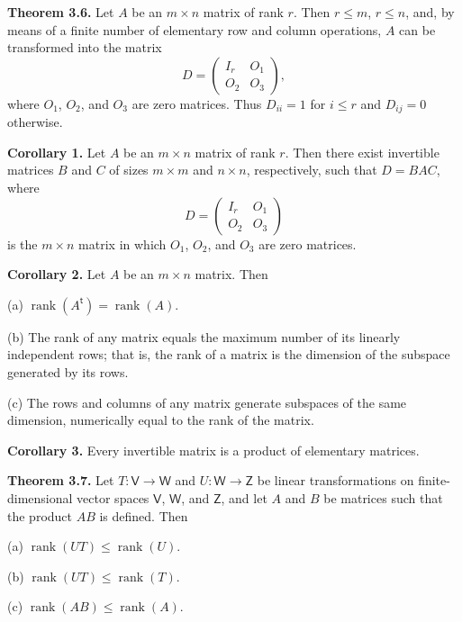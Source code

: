 \documentclass{article}
\newcommand{\0}{\mathit{0}}
\begin{document}
\medskip

\textbf{Theorem 3.6.} Let $A$ be an $m \times n$ matrix of rank $r$. Then $r \leq m$, $r \leq n$, 
and, by means of a finite number of elementary row and column operations, 
$A$ can be transformed into the matrix
\[
D = 
\begin{pmatrix}
I_r & O_1 \\
O_2 & O_3
\end{pmatrix},
\]
where $O_1$, $O_2$, and $O_3$ are zero matrices. Thus $D_{ii} = 1$ for $i \leq r$ and 
$D_{ij} = 0$ otherwise.

\medskip

\textbf{Corollary 1.} Let $A$ be an $m \times n$ matrix of rank $r$. Then there exist 
invertible matrices $B$ and $C$ of sizes $m \times m$ and $n \times n$, respectively, such that 
$D = BAC$,
where
\[
D = 
\begin{pmatrix}
I_r & O_1 \\
O_2 & O_3
\end{pmatrix}
\]
is the $m \times n$ matrix in which $O_1$, $O_2$, and $O_3$ are zero matrices.

\medskip

\textbf{Corollary 2.} Let $A$ be an $m \times n$ matrix. Then  

(a) $\operatorname{rank}(A^{\mathsf{t}}) = \operatorname{rank}(A)$.  

(b) The rank of any matrix equals the maximum number of its linearly independent rows; that is, the rank of a matrix is the dimension of the subspace generated by its rows.  

(c) The rows and columns of any matrix generate subspaces of the same dimension, numerically equal to the rank of the matrix.

\medskip

\textbf{Corollary 3.} Every invertible matrix is a product of elementary matrices.

\medskip

\textbf{Theorem 3.7.} Let $T: \mathsf{V} \to \mathsf{W}$ and $U: \mathsf{W} \to \mathsf{Z}$ be linear transformations 
on finite-dimensional vector spaces $\mathsf{V}$, $\mathsf{W}$, and $\mathsf{Z}$, and let $A$ and $B$ be matrices 
such that the product $AB$ is defined. Then  

(a) $\operatorname{rank}(UT) \leq \operatorname{rank}(U)$.

(b) $\operatorname{rank}(UT) \leq \operatorname{rank}(T)$.  

(c) $\operatorname{rank}(AB) \leq \operatorname{rank}(A)$.  
\end{document}
